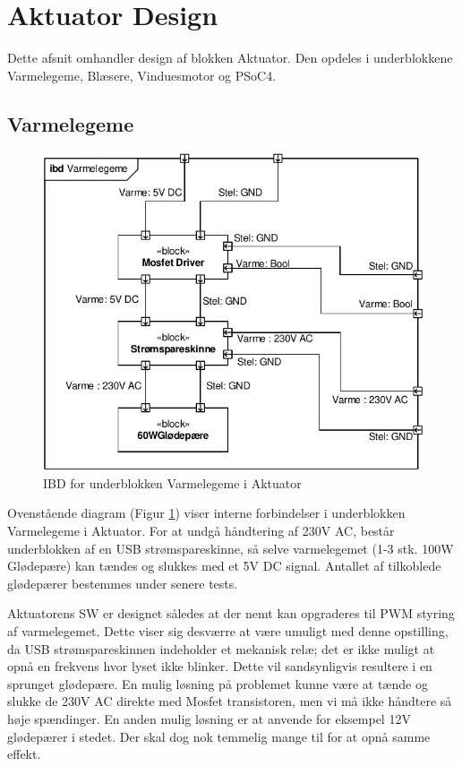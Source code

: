 \section{Aktuator Design} \label{sec:Aktuator_Design}

Dette afsnit omhandler design af blokken Aktuator. Den opdeles i underblokkene Varmelegeme, Blæsere, Vinduesmotor og PSoC4.


\subsection{Varmelegeme}

\begin{figure}[h]
\centering 
\includegraphics[width={\textwidth-5cm}, trim=0 0 0 0, clip=true] {../fig/ibd_varmelegeme.pdf}
\caption{IBD for underblokken Varmelegeme i Aktuator}
\label{fig:ibd_varmelegeme}
\end{figure}

Ovenstående diagram (Figur \ref{fig:ibd_varmelegeme}) viser interne forbindelser i underblokken Varmelegeme i Aktuator. 
For at undgå håndtering af 230V AC, består underblokken af en USB strømspareskinne, så selve varmelegemet (1-3 stk. 100W Glødepære) kan tændes og slukkes med et 5V DC signal. 
Antallet af tilkoblede glødepærer bestemmes under senere tests.

Aktuatorens SW er designet således at der nemt kan opgraderes til PWM styring af varmelegemet. 
Dette viser sig desværre at være umuligt med denne opstilling, da USB strømspareskinnen indeholder et mekanisk relæ; det er ikke muligt at opnå en frekvens hvor lyset ikke blinker. 
Dette vil sandsynligvis resultere i en sprunget glødepære.
En mulig løsning på problemet kunne være at tænde og slukke de 230V AC direkte med Mosfet transistoren, men vi må ikke håndtere så høje spændinger. 
En anden mulig løsning er at anvende for eksempel 12V glødepærer i stedet. Der skal dog nok temmelig mange til for at opnå samme effekt. 

